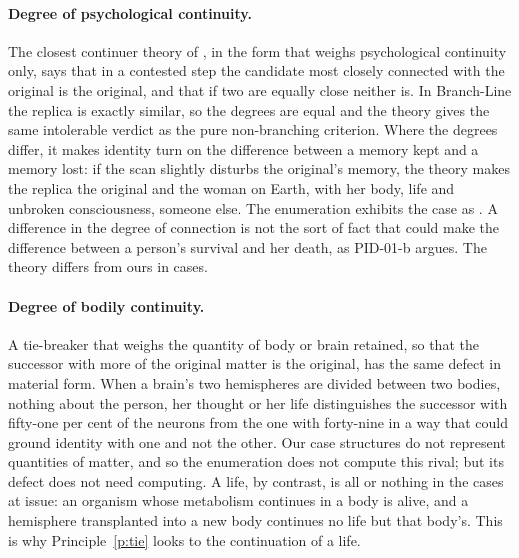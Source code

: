 \documentclass{situationist-preprint}
\begin{document}
\paragraph{Degree of psychological continuity.} The closest continuer theory of \citet{Nozick1981}, in the form that weighs psychological continuity only, says that in a contested step the candidate most closely connected with the original is the original, and that if two are equally close neither is. In Branch-Line the replica is exactly similar, so the degrees are equal and the theory gives the same intolerable verdict as the pure non-branching criterion. Where the degrees differ, it makes identity turn on the difference between a memory kept and a memory lost: if the scan slightly disturbs the original's memory, the theory makes the replica the original and the woman on Earth, with her body, life and unbroken consciousness, someone else. The enumeration exhibits the case as \caseBranchLineWeak. A difference in the degree of connection is not the sort of fact that could make the difference between a person's survival and her death, as PID-01-b argues. The theory differs from ours in \stdisC{} cases.

\paragraph{Degree of bodily continuity.} A tie-breaker that weighs the quantity of body or brain retained, so that the successor with more of the original matter is the original, has the same defect in material form. When a brain's two hemispheres are divided between two bodies, nothing about the person, her thought or her life distinguishes the successor with fifty-one per cent of the neurons from the one with forty-nine in a way that could ground identity with one and not the other. Our case structures do not represent quantities of matter, and so the enumeration does not compute this rival; but its defect does not need computing. A life, by contrast, is all or nothing in the cases at issue: an organism whose metabolism continues in a body is alive, and a hemisphere transplanted into a new body continues no life but that body's. This is why Principle~\ref{p:tie} looks to the continuation of a life.
\end{document}
